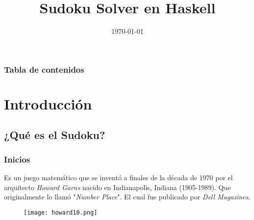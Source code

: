 \documentclass{beamer}
\title[Sudoku Solver]{Sudoku Solver en Haskell} %
\author{} %
\institute[UNAM] %
{
Rodríguez Hernández Alexis Arturo \\
Sánchez Morales Rodrigo Alejandro \\
\medskip
Universidad Nacional Autónoma de México \\ %
Facultad de Ciencias \\
\medskip
\textit{Programación Declarativa, 2018-II} %
}
\date{\today} %
\begin{document}
\begin{frame}
\titlepage %
\end{frame}

\begin{frame}
\frametitle{Tabla de contenidos} %
\tableofcontents %
\end{frame}


\section{Introducción} %

\subsection{¿Qué es el Sudoku?} %

\begin{frame}
\frametitle{Inicios}
 Es un juego matemático que se inventó a finales de la década de 1970 por el arquitecto \textit{Howard Garns} nacido en Indianapolis, Indiana (1905-1989). Que originalmente lo llamó "\textit{Number Place}". El cual fue publicado por \textit{Dell Magazines}.
\begin{figure}
\centering
  \texttt{[image: howard10.png]}
\end{figure}
\end{frame}
\end{document}
